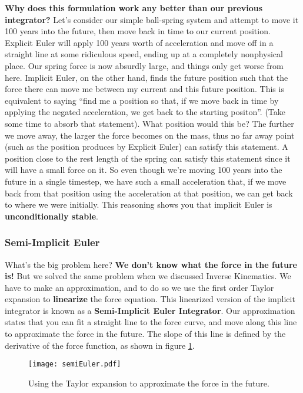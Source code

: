 \documentclass[]{article}
\begin{document}
\textbf{Why does this formulation work any better than our previous integrator?} Let's consider our simple ball-spring system and attempt to move it 100 years into the future, then move back in time to our current position. Explicit Euler will apply 100 years worth of acceleration and move off in a straight line at some ridiculous speed, ending up at a completely nonphysical place. Our spring force is now absurdly large, and things only get worse from here. Implicit Euler, on the other hand, finds the future position such that the force there can move me between my current and this future position. This is equivalent to saying ``find me a position so that, if we move back in time by applying the negated acceleration, we get back to the starting positon''. (Take some time to absorb that statement). What position would this be? The further we move away, the larger the force becomes on the mass, thus no far away point (such as the position produces by Explicit Euler) can satisfy this statement. A position close to the rest length of the spring can satisfy this statement since it will have a small force on it. So even though we're moving 100 years into the future in a single timestep, we have such a small acceleration that, if we move back from that position using the acceleration at that position, we can get back to where we were initially. This reasoning shows you that implicit Euler is \textbf{unconditionally stable}.

\subsubsection{Semi-Implicit Euler}

What's the big problem here? \textbf{We don't know what the force in the future is!} But we solved the same problem when we discussed Inverse Kinematics. We have to make an approximation, and to do so we use the first order Taylor expansion to \textbf{linearize} the force equation. This linearized version of the implicit integrator is known as a \textbf{Semi-Implicit Euler Integrator}. Our approximation states that you can fit a straight line to the force curve, and move along this line to approximate the force in the future. The slope of this line is defined by the derivative of the force function, as shown in figure \ref{semiimplicitfig}.

\begin{figure}[htp]
    \centering
    \texttt{[image: semiEuler.pdf]}
    \caption{Using the Taylor expansion to approximate the force in the future.}
	\label{semiimplicitfig}
\end{figure}
\end{document}
